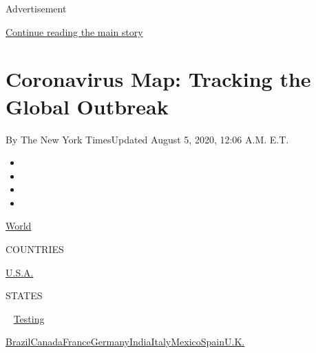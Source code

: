 Advertisement

\protect\hyperlink{after-top}{Continue reading the main story}

\hypertarget{coronavirus-map-tracking-the-global-outbreak}{%
\section{Coronavirus Map: Tracking the Global
Outbreak}\label{coronavirus-map-tracking-the-global-outbreak}}

By The New York TimesUpdated August 5, 2020, 12:06 A.M. E.T.

\begin{itemize}
\item
\item
\item
\item
\end{itemize}

\href{https://www.nytimes3xbfgragh.onion/interactive/2020/world/coronavirus-maps.html}{World}~

COUNTRIES

\textbar{}
\href{https://www.nytimes3xbfgragh.onion/interactive/2020/us/coronavirus-us-cases.html}{U.S.A.}~

STATES

~
\href{https://www.nytimes3xbfgragh.onion/interactive/2020/us/coronavirus-testing.html}{Testing}

\href{https://www.nytimes3xbfgragh.onion/interactive/2020/world/americas/brazil-coronavirus-cases.html}{Brazil}\href{https://www.nytimes3xbfgragh.onion/interactive/2020/world/canada/canada-coronavirus-cases.html}{Canada}\href{https://www.nytimes3xbfgragh.onion/interactive/2020/world/europe/france-coronavirus-cases.html}{France}\href{https://www.nytimes3xbfgragh.onion/interactive/2020/world/europe/germany-coronavirus-cases.html}{Germany}\href{https://www.nytimes3xbfgragh.onion/interactive/2020/world/asia/india-coronavirus-cases.html}{India}\href{https://www.nytimes3xbfgragh.onion/interactive/2020/world/europe/italy-coronavirus-cases.html}{Italy}\href{https://www.nytimes3xbfgragh.onion/interactive/2020/world/americas/mexico-coronavirus-cases.html}{Mexico}\href{https://www.nytimes3xbfgragh.onion/interactive/2020/world/europe/spain-coronavirus-cases.html}{Spain}\href{https://www.nytimes3xbfgragh.onion/interactive/2020/world/europe/united-kingdom-coronavirus-cases.html}{U.K.}

